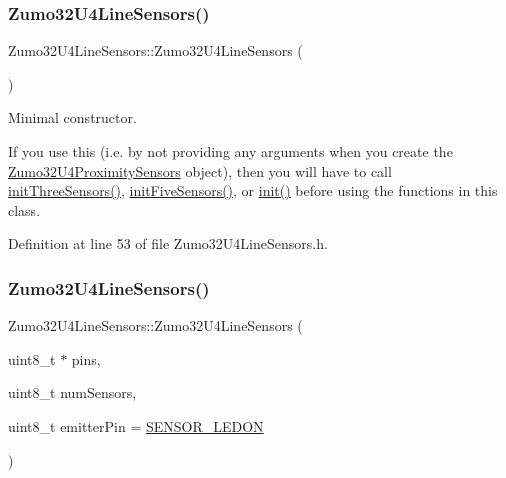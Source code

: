 \subsubsection{\texorpdfstring{Zumo32\+U4\+Line\+Sensors()}{Zumo32U4LineSensors()}\hspace{0.1cm}{\footnotesize\ttfamily [1/2]}}
{\footnotesize\ttfamily Zumo32\+U4\+Line\+Sensors\+::\+Zumo32\+U4\+Line\+Sensors (\begin{DoxyParamCaption}{ }\end{DoxyParamCaption})\hspace{0.3cm}{\ttfamily [inline]}}



Minimal constructor. 

If you use this (i.\+e. by not providing any arguments when you create the \hyperlink{class_zumo32_u4_proximity_sensors}{Zumo32\+U4\+Proximity\+Sensors} object), then you will have to call \hyperlink{class_zumo32_u4_line_sensors_a880737a0df457e9acf3277b2342e4087}{init\+Three\+Sensors()}, \hyperlink{class_zumo32_u4_line_sensors_a3873997ed35fbc1c6c57411f6cee1f2d}{init\+Five\+Sensors()}, or \hyperlink{class_zumo32_u4_line_sensors_aa8656b7a8c3d27302d76431acb93c2ac}{init()} before using the functions in this class. 

Definition at line 53 of file Zumo32\+U4\+Line\+Sensors.\+h.

\mbox{\label{class_zumo32_u4_line_sensors_a59ecf283662fbcb2993d74fd436b0e53}} 
\subsubsection{\texorpdfstring{Zumo32\+U4\+Line\+Sensors()}{Zumo32U4LineSensors()}\hspace{0.1cm}{\footnotesize\ttfamily [2/2]}}
{\footnotesize\ttfamily Zumo32\+U4\+Line\+Sensors\+::\+Zumo32\+U4\+Line\+Sensors (\begin{DoxyParamCaption}\item[{uint8\+\_\+t $\ast$}]{pins,  }\item[{uint8\+\_\+t}]{num\+Sensors,  }\item[{uint8\+\_\+t}]{emitter\+Pin = {\ttfamily \hyperlink{_zumo32_u4_line_sensors_8h_a661904c7fa6e0b2cb9645e2ef272cfcd}{S\+E\+N\+S\+O\+R\+\_\+\+L\+E\+D\+ON}} }\end{DoxyParamCaption})\hspace{0.3cm}{\ttfamily [inline]}}



